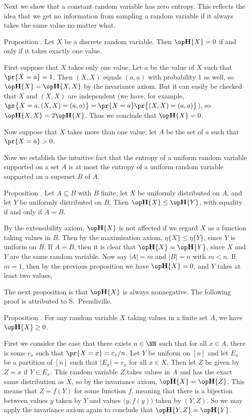 Next we show that a constant random variable has zero entropy. This reflects the idea that we get
no information from sampling a random variable if it always takes the same value no matter what.

\proclaim Proposition \advthm. Let $X$ be a discrete random variable.
Then $\Eta\{X\} = 0$ if and only if it takes exactly one value.

\proof First suppose that $X$ takes only one value.
Let $a$ be the value of $X$ such that $\pr\{X=a\} = 1$.
Then $(X,X)$ equals $(a,a)$ with probability $1$ as well,
so $\Eta\{X\} = \Eta\{X,X\}$ by the invariance axiom. But it can easily be checked that
$X$ and $(X,X)$ are independent (we have, for example, $\pr\bigl\{X = a, (X,X)= (a,a)\bigr\} =
\pr\{X = a\}\pr\bigl\{(X,X) = (a,a)\bigr\}$), so $\Eta\{X,X\} = 2\Eta\{X\}$. Thus we conclude
that $\Eta\{X\} = 0$.

Now suppose that $X$ takes more than one value; let $A$ be the set of $a$ such that
$\pr\{X = a\} > 0$.
\slug

Now we establish the intuitive fact
that the entropy of a uniform random variable supported on a set $A$ is at most
the entropy of a uniform random variable supported on a superset $B$ of $A$.

\proclaim Proposition \advthm. Let $A\subseteq B$ with $B$ finite,
let $X$ be uniformly distributed on $A$, and let $Y$ be uniformly distributed on $B$.
Then $\Eta\{X\} \le \Eta\{Y\}$, with equality if and only if $A = B$.

\proof By the extensibility axiom, $\Eta\{X\}$ is not affected if we regard $X$ as a function
taking values in $B$. Then by the maximisation axiom, $\eta\{X\}\le \eta\{Y\}$, since $Y$ is
uniform on $B$. If $A = B$, then it is clear that $\Eta\{X\} = \Eta\{Y\}$, since $X$ and $Y$
are the same random variable.
Now say $|A| = m$ and $|B| = n$ with $m<n$. If $m=1$, then by the previous proposition
we have $\Eta\{X\} = 0$, and $Y$ takes at least two values, 

The next proposition is that $\Eta\{X\}$ is always nonnegative. The following
proof is attributed to S.~Prendiville.

\proclaim Proposition \advthm. For any random variable $X$ taking values in a finite set $A$,
we have $\Eta\{X\} \ge 0$.

\proof First we consider the case that there exists $n\in \NN$ such that for all $x\in A$, there is some
$c_x$ such that $\pr\{X = x\} = c_x/n$. Let $Y$ be uniform on $[n]$ and let $E_x$ be a partition
of $[n]$ such that $|E_x| = c_x$ for all $x\in X$. Then let $Z$ be given by $Z = x$ if $Y\in E_x$.
This random variable $Z$ takes values in $A$ and has the exact same distribution as $X$, so
by the invariance axiom, $\Eta\{X\} = \Eta\{Z\}$.
This means that $Z = f(Y)$ for some function $f$, meaning that there is a bijection between
values $y$ taken by $Y$ and values $\bigl(y, f(y)\bigr)$ taken by $(Y,Z)$. So we may apply the invariance
axiom again to conclude that $\Eta\{Y,Z\} = \Eta\{Y\}$.

